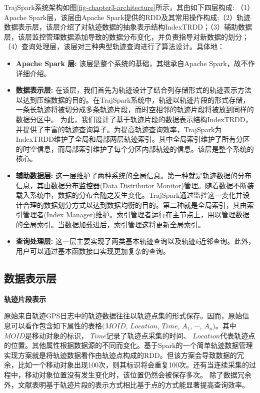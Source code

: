 TrajSpark系统架构如图\ref{fig-chapter3-architecture}所示，其由如下四层构成: （1）Apache Spark层，该层由Apache Spark提供的RDD及其常用操作构成;（2）轨迹数据表示层，该层介绍了对轨迹数据的抽象表示结构IndexTRDD；（3）辅助数据层，该层监控管理数据添加导致的数据分布变化，并负责指导对新数据的划分；（4）查询处理层，该层对三种典型轨迹查询进行了算法设计。具体地：

\begin{itemize}
	\item \textbf{Apache Spark 层:}  
	该层是整个系统的基础，其继承自Apache Spark，故不作详细介绍。
	
	\item \textbf{数据表示层:} 在该层，我们首先为轨迹设计了结合列存储形式的轨迹表示方法以达到压缩数据的目的。在TrajSpark系统中，轨迹以轨迹片段的形式存储，一条长轨迹将被切分成多条轨迹片段，而时空相邻的轨迹片段将被放到同样的数据分区中。
	为此，我们设计了基于轨迹片段的数据表示结构IndexTRDD，并提供了丰富的轨迹查询算子。为提高轨迹查询效率，TrajSpark为IndexTRDD维护了全局和局部两层轨迹索引。其中全局索引维护了所有分区的时空信息，而局部索引维护了每个分区内部轨迹的信息。该层是整个系统的核心。
	
	\item \textbf{辅助数据层:} 这一层维护了两种系统的全局信息。第一种就是轨迹数据的分布信息，其由数据分布监控器(Data Distributor Monitor)管理。随着数据不断装载入系统中，数据的分布会随之发生变化。TrajSpark通过监控这一变化并设计合理的数据划分方式以达到数据均衡的目的。第二种就是全局索引，其由索引管理者(Index Manager)维护。索引管理者运行在主节点上，用以管理数据的全局索引。当数据加载进后，索引管理这将更新全局索引。
	
	\item \textbf{查询处理层:} 这一层主要实现了两类基本轨迹查询以及轨迹$k$近邻查询。此外，用户可以通过基本函数接口实现更加复杂的查询。
\end{itemize}

\subsection{数据表示层}

\textbf{轨迹片段表示}
	
	原始来自轨迹GPS日志中的轨迹数据往往以轨迹点集的形式保存。因而，原始信息可以看作包含如下属性的表格$(MOID$, $Location$, $Time$, $A_{1}$, $\cdots$, $A_{n})$。其中$MOID$是移动对象的标识，  $Time$记录了轨迹点采集的时间、 $Location$代表轨迹点的位置。其他属性根据数据源的不同而变化。基于Spark的一个简单轨迹数据管理实现方案就是将轨迹数据看作由轨迹点构成的RDD。但该方案会导致数据的冗余，比如一个移动对象出现100次，则其标识将会重复100次。还有当连续采集的过程中，移动对象位置没有发生变化时，该位置仍然会被保存多次。
	除了数据冗余外，文献\cite{ChakkaEP03}表明基于轨迹片段的表示方式相比基于点的方式能显著提高查询效率。
	
